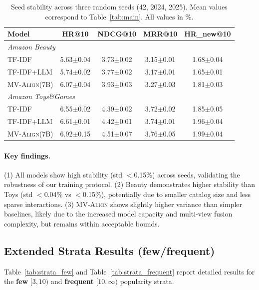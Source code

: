 \documentclass[sigconf,natbib=true]{acmart}
\newcommand{\model}{\textsc{MV-Align}\xspace}
\begin{document}
\begin{table}[h]
\caption{Seed stability across three random seeds (42, 2024, 2025). Mean values correspond to Table~\ref{tab:main}. All values in \%.}
\label{tab:seed_stability}
\centering
\scriptsize
\begin{tabular}{lcccc}
\toprule
\textbf{Model} & \textbf{HR@10} & \textbf{NDCG@10} & \textbf{MRR@10} & \textbf{HR\_new@10} \\
\midrule
\multicolumn{5}{l}{\textit{Amazon Beauty}} \\
TF-IDF & 5.63$\pm$0.04 & 3.73$\pm$0.02 & 3.15$\pm$0.01 & 1.68$\pm$0.04 \\
TF-IDF+LLM & 5.74$\pm$0.02 & 3.77$\pm$0.02 & 3.17$\pm$0.01 & 1.65$\pm$0.01 \\
\model (7B) & 6.07$\pm$0.04 & 3.93$\pm$0.03 & 3.27$\pm$0.03 & 1.81$\pm$0.03 \\
\midrule
\multicolumn{5}{l}{\textit{Amazon Toys\&Games}} \\
TF-IDF & 6.55$\pm$0.02 & 4.39$\pm$0.02 & 3.72$\pm$0.02 & 1.85$\pm$0.05 \\
TF-IDF+LLM & 6.61$\pm$0.01 & 4.42$\pm$0.01 & 3.74$\pm$0.01 & 1.96$\pm$0.04 \\
\model (7B) & 6.92$\pm$0.15 & 4.51$\pm$0.07 & 3.76$\pm$0.05 & 1.99$\pm$0.04 \\
\bottomrule
\end{tabular}
\end{table}

\paragraph{Key findings.}
(1) All models show high stability (std $<$0.15\%) across seeds,
validating the robustness of our training protocol.
(2) Beauty demonstrates higher stability than Toys (std $<$0.04\% vs 
$<$0.15\%), potentially due to smaller catalog size and less sparse 
interactions.
(3) \model shows slightly higher variance than simpler baselines, 
likely due to the increased model capacity and multi-view fusion 
complexity, but remains within acceptable bounds.

\subsection{Extended Strata Results (few/frequent)}
\label{app:strata}
Table~\ref{tab:strata_few} and Table~\ref{tab:strata_frequent}
report detailed results for the \textbf{few} $[3,10)$ and 
\textbf{frequent} $[10,\infty)$ popularity strata.
\end{document}
